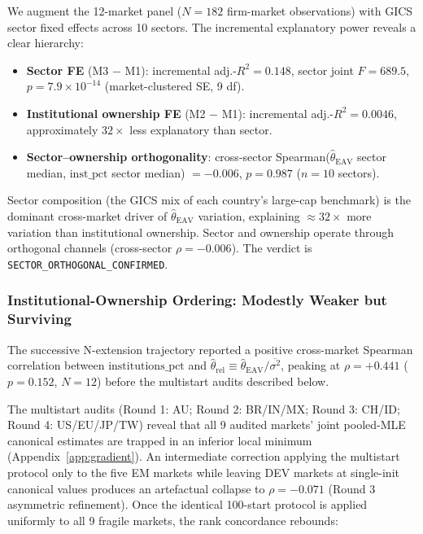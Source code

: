 \documentclass[12pt,a4paper]{article}
\begin{document}
We augment the 12-market panel ($N = 182$ firm-market observations) with
GICS sector fixed effects across 10 sectors. The incremental explanatory power
reveals a clear hierarchy:

\begin{itemize}
\item \textbf{Sector FE} (M3 $-$ M1): incremental adj.-$R^2 = 0.148$, sector joint
  $F = 689.5$, $p = 7.9 \times 10^{-14}$ (market-clustered SE, 9 df).
\item \textbf{Institutional ownership FE} (M2 $-$ M1): incremental adj.-$R^2 = 0.0046$,
  approximately $32\times$ less explanatory than sector.
\item \textbf{Sector--ownership orthogonality}: cross-sector Spearman($\hat{\theta}_{\mathrm{EAV}}$
  sector median, $\mathrm{inst\_pct}$ sector median) $= -0.006$, $p = 0.987$ ($n = 10$
  sectors).
\end{itemize}

Sector composition (the GICS mix of each country's large-cap benchmark) is the dominant
cross-market driver of $\hat{\theta}_{\mathrm{EAV}}$ variation, explaining $\approx 32\times$
more variation than institutional ownership. Sector and ownership operate through orthogonal
channels (cross-sector $\rho = -0.006$). The verdict is
\texttt{SECTOR\_ORTHOGONAL\_CONFIRMED}.

\subsubsection{Institutional-Ownership Ordering: Modestly Weaker but Surviving}
\label{sec:spearman_panel}

The successive N-extension trajectory reported a positive cross-market Spearman
correlation between $\mathrm{institutions\_pct}$ and $\hat{\theta}_{\mathrm{rel}} \equiv
\hat{\theta}_{\mathrm{EAV}} / \overline{\sigma^2}$, peaking at $\rho = +0.441$ ($p = 0.152$,
$N = 12$) before the multistart audits described below.

The multistart audits (Round 1: AU; Round 2: BR/IN/MX; Round 3: CH/ID; Round 4: US/EU/JP/TW) reveal
that all 9 audited markets' joint pooled-MLE canonical estimates are trapped in an inferior
local minimum (Appendix~\ref{app:gradient}). An intermediate correction applying the
multistart protocol only to the five EM markets while leaving DEV markets at single-init
canonical values produces an artefactual collapse to $\rho = -0.071$ (Round 3 asymmetric
refinement). Once the identical 100-start protocol is applied uniformly to all 9 fragile
markets, the rank concordance rebounds:
\end{document}
